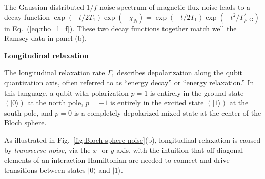 \documentclass[aip,apr,twocolumn,showpacs,superscriptaddress,groupedaddress,nofootinbib,reprint]{revtex4-1}  %
\begin{document}
\begin{figure*}[!t]
{    The Gaussian-distributed $1/f$ noise spectrum of magnetic flux noise leads to a decay function $\exp(-t/2T_1)\exp(-\chi_N) = \exp (-t/2T_1) \exp(-t^2/T_{\varphi,\mathrm{G}}^2)$ in Eq.~(\ref{eq:rho_1_f}). These two decay functions together match well the Ramsey data in panel (b).}
\label{fig:T1-T2}
\end{figure*}

\noindent \textbf{Longitudinal relaxation}

The longitudinal relaxation rate $\Gamma_1$ describes depolarization along the qubit quantization axis, often referred to as ``energy decay'' or ``energy relaxation.'' In this language, a qubit with polarization $p=1$ is entirely in the ground state $(\lvert0\rangle)$ at the north pole, $p=-1$ is entirely in the excited state $(\lvert1\rangle)$ at the south pole, and $p=0$ is a completely depolarized mixed state at the center of the Bloch sphere.

As illustrated in Fig.~\ref{fig:Bloch-sphere-noise}(b), longitudinal relaxation is caused by {\em transverse noise}, via the $x$- or $y$-axis, with the intuition that off-diagonal elements of an interaction Hamiltonian are needed to connect and drive transitions between states $|0\rangle$ and $|1 \rangle$.
\end{document}
